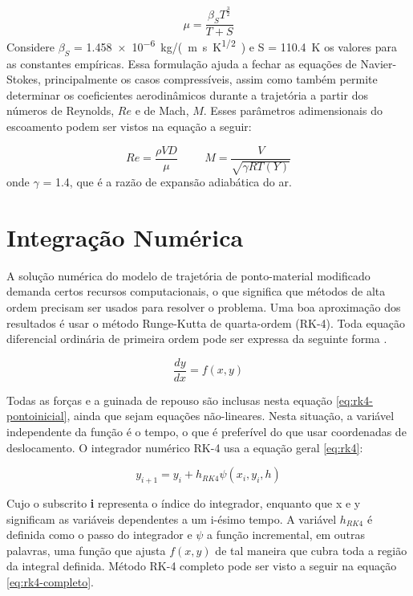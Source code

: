 \begin{equation}
\label{eq:sutherICAO}
\mu = \frac{\beta_{S}T^{\frac{3}{2}}}{T + S}
\end{equation}
%
Considere $\beta_{S}$ = \qty{1,458e-6}{kg/(m.s.K^{1/2})} e S = \qty{110,4}{\kelvin} os valores para as constantes empíricas. Essa formulação ajuda a fechar as equações de Navier-Stokes, principalmente os casos compressíveis, assim como também permite determinar os coeficientes aerodinâmicos durante a trajetória a partir dos números de Reynolds, $Re$ e de Mach, $M$. Esses parâmetros adimensionais do escoamento podem ser vistos na equação a seguir:

\begin{equation}
    Re = \frac{\rho V D}{\mu} \hspace{1cm}
    M = \frac{V}{\sqrt{\gamma RT(Y)}}
\end{equation}
%
onde $\gamma$ = \num{1,4}, que é a razão de expansão adiabática do ar.

\section{Integração Numérica}
\label{sec:numint}

A solução numérica do modelo de trajetória de ponto-material modificado demanda certos recursos computacionais, o que significa que métodos de alta ordem precisam ser usados para resolver o problema. Uma boa aproximação dos resultados é usar o método Runge-Kutta de quarta-ordem (RK-4). Toda equação diferencial ordinária de primeira ordem pode ser expressa da seguinte forma \cite{ruggiero1996calculo}.

\begin{equation}
    \label{eq:rk4-pontoinicial}
    \frac{dy}{dx} = f(x,y)
\end{equation}

Todas as forças e a guinada de repouso são inclusas nesta equação \ref{eq:rk4-pontoinicial}, ainda que sejam equações não-lineares. Nesta situação, a variável independente da função é o tempo, o que é preferível do que usar coordenadas de deslocamento. O integrador numérico RK-4 usa a equação geral \ref{eq:rk4}:

\begin{equation}
    \label{eq:rk4}
    y_{i+1} = y_{i} + h_{RK4}\psi(x_{i},y_{i},h)
\end{equation}

Cujo o subscrito \textbf{i} representa o índice do integrador, enquanto que x e y significam as variáveis dependentes a um i-ésimo tempo. A variável $h_{RK4}$ é definida como o passo do integrador e $\psi$ a função incremental, em outras palavras, uma função que ajusta $f(x,y)$ de tal maneira que cubra toda a região da integral definida. Método RK-4 completo pode ser visto a seguir na equação \ref{eq:rk4-completo}.

